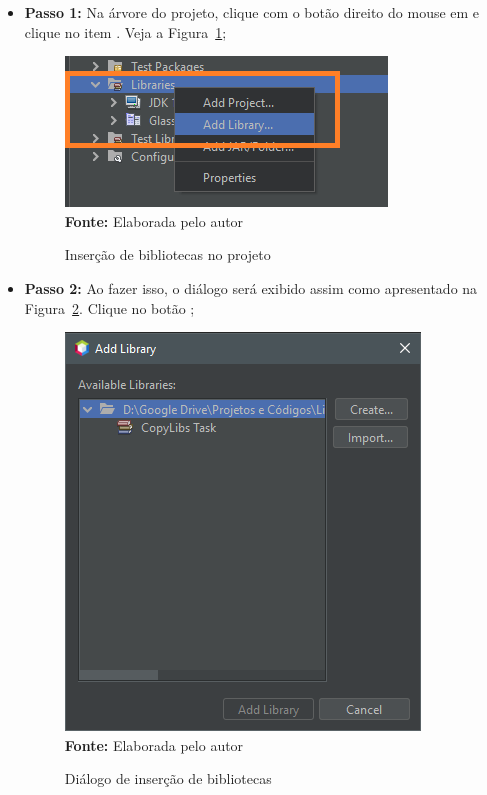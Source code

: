 \begin{itemize}
    
    \item \textbf{Passo 1:} Na árvore do projeto, clique com o botão direito do mouse em  e clique no item . Veja a Figura~\ref{fig:cap01AddLibraryProjeto};
    
    \FloatBarrier
    \begin{figure}[!htbp]
        \centering
        \caption{Inserção de bibliotecas no projeto}
        \includegraphics[scale=0.9]{imagens/cap01AddLibraryProjeto}
        \\\textbf{Fonte:} Elaborada pelo autor
        \label{fig:cap01AddLibraryProjeto}
    \end{figure}
    \FloatBarrier
    
    \item \textbf{Passo 2:} Ao fazer isso, o diálogo  será exibido assim como apresentado na Figura~\ref{fig:cap01AddLibraryDialog}. Clique no botão ;
    
    \FloatBarrier
    \begin{figure}[!htbp]
        \centering
        \caption{Diálogo de inserção de bibliotecas}
        \includegraphics[scale=0.9]{imagens/cap01AddLibraryDialog}
        \\\textbf{Fonte:} Elaborada pelo autor
        \label{fig:cap01AddLibraryDialog}
    \end{figure}
    \FloatBarrier
    

\end{itemize}
